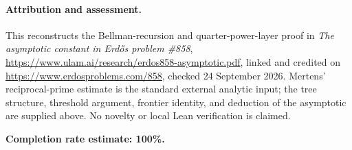 \paragraph{Attribution and assessment.}
This reconstructs the Bellman-recursion and quarter-power-layer proof in \emph{The asymptotic constant in Erd\H{o}s problem \#858}, \url{https://www.ulam.ai/research/erdos858-asymptotic.pdf}, linked and credited on \url{https://www.erdosproblems.com/858}, checked 24 September 2026. Mertens' reciprocal-prime estimate is the standard external analytic input; the tree structure, threshold argument, frontier identity, and deduction of the asymptotic are supplied above. No novelty or local Lean verification is claimed.

\textbf{Completion rate estimate: 100\%.}

